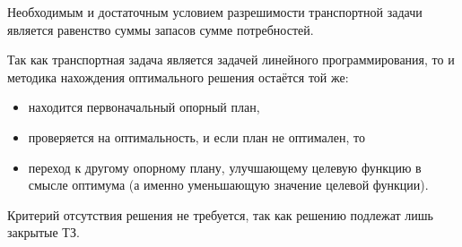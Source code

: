 \documentclass[17pt]{extarticle}
\begin{document}
\begin{theorem}
    Необходимым и достаточным условием разрешимости транспортной задачи является равенство суммы запасов сумме потребностей.
\end{theorem}

Так как транспортная задача является задачей линейного программирования, то и методика нахождения оптимального решения остаётся той же:
\begin{itemize}
    \item находится первоначальный опорный план,
    \item проверяется на оптимальность, и если план не оптимален, то
    \item переход к другому опорному плану, улучшающему целевую функцию в смысле оптимума (а именно уменьшающую значение целевой функции).
\end{itemize}

Критерий отсутствия решения не требуется, так как решению подлежат лишь закрытые ТЗ.
\end{document}
